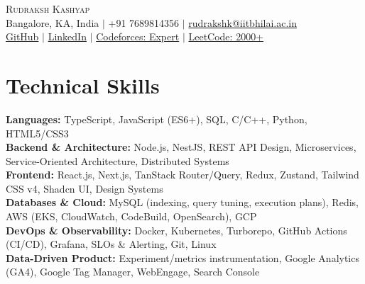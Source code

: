 \documentclass[a4paper,10pt]{article}
\newcommand{\skillrow}[2]{\textbf{#1:} #2 \\[1.5pt]}
\begin{document}
\begin{center}
  {\Huge\scshape Rudraksh Kashyap} \\[5pt]
  \small
  Bangalore, KA, India \;$|$\; +91 7689814356 \;$|$\;
  \href{mailto:rudrakshk@iitbhilai.ac.in}{rudrakshk@iitbhilai.ac.in} \\[2pt]
  \href{https://github.com/RudrakshKashyap}{GitHub} \;$|$\;
  \href{https://linkedin.com/in/rudrakshkashyap}{LinkedIn} \;$|$\;
  \href{https://codeforces.com/profile/rudraksh}{Codeforces: Expert} \;$|$\;
  \href{https://leetcode.com/rudraksh26}{LeetCode: 2000+}
\end{center}
\vspace{-4pt}

\section{Technical Skills}
\small
\skillrow{Languages}{TypeScript, JavaScript (ES6+), SQL, C/C++, Python, HTML5/CSS3}
\skillrow{Backend \& Architecture}{Node.js, NestJS, REST API Design, Microservices, Service-Oriented Architecture, Distributed Systems}
\skillrow{Frontend}{React.js, Next.js, TanStack Router/Query, Redux, Zustand, Tailwind CSS v4, Shadcn UI, Design Systems}
\skillrow{Databases \& Cloud}{MySQL (indexing, query tuning, execution plans), Redis, AWS (EKS, CloudWatch, CodeBuild, OpenSearch), GCP}
\skillrow{DevOps \& Observability}{Docker, Kubernetes, Turborepo, GitHub Actions (CI/CD), Grafana, SLOs \& Alerting, Git, Linux}
\skillrow{Data-Driven Product}{Experiment/metrics instrumentation, Google Analytics (GA4), Google Tag Manager, WebEngage, Search Console}

\end{document}
